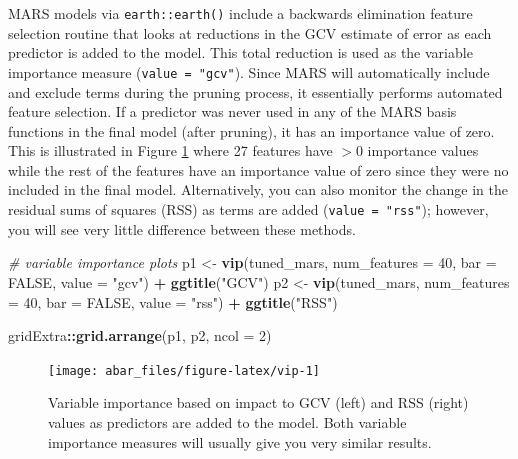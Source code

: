 \documentclass[]{book}
\newenvironment{Shaded}{\begin{snugshade}}{\end{snugshade}}
\newcommand{\CommentTok}[1]{\textcolor[rgb]{0.56,0.35,0.01}{\textit{#1}}}
\newcommand{\DataTypeTok}[1]{\textcolor[rgb]{0.13,0.29,0.53}{#1}}
\newcommand{\DecValTok}[1]{\textcolor[rgb]{0.00,0.00,0.81}{#1}}
\newcommand{\KeywordTok}[1]{\textcolor[rgb]{0.13,0.29,0.53}{\textbf{#1}}}
\newcommand{\NormalTok}[1]{#1}
\newcommand{\OperatorTok}[1]{\textcolor[rgb]{0.81,0.36,0.00}{\textbf{#1}}}
\newcommand{\OtherTok}[1]{\textcolor[rgb]{0.56,0.35,0.01}{#1}}
\newcommand{\StringTok}[1]{\textcolor[rgb]{0.31,0.60,0.02}{#1}}
\theoremstyle{definition}
\theoremstyle{definition}
\theoremstyle{definition}
\theoremstyle{remark}
\begin{document}
MARS models via \texttt{earth::earth()} include a backwards elimination
feature selection routine that looks at reductions in the GCV estimate
of error as each predictor is added to the model. This total reduction
is used as the variable importance measure (\texttt{value\ =\ "gcv"}).
Since MARS will automatically include and exclude terms during the
pruning process, it essentially performs automated feature selection. If
a predictor was never used in any of the MARS basis functions in the
final model (after pruning), it has an importance value of zero. This is
illustrated in Figure \ref{fig:vip} where 27 features have \(>0\)
importance values while the rest of the features have an importance
value of zero since they were no included in the final model.
Alternatively, you can also monitor the change in the residual sums of
squares (RSS) as terms are added (\texttt{value\ =\ "rss"}); however,
you will see very little difference between these methods.

\begin{Shaded}
\begin{Highlighting}[]
\CommentTok{# variable importance plots}
\NormalTok{p1 <-}\StringTok{ }\KeywordTok{vip}\NormalTok{(tuned_mars, }\DataTypeTok{num_features =} \DecValTok{40}\NormalTok{, }\DataTypeTok{bar =} \OtherTok{FALSE}\NormalTok{, }\DataTypeTok{value =} \StringTok{"gcv"}\NormalTok{) }\OperatorTok{+}\StringTok{ }\KeywordTok{ggtitle}\NormalTok{(}\StringTok{"GCV"}\NormalTok{)}
\NormalTok{p2 <-}\StringTok{ }\KeywordTok{vip}\NormalTok{(tuned_mars, }\DataTypeTok{num_features =} \DecValTok{40}\NormalTok{, }\DataTypeTok{bar =} \OtherTok{FALSE}\NormalTok{, }\DataTypeTok{value =} \StringTok{"rss"}\NormalTok{) }\OperatorTok{+}\StringTok{ }\KeywordTok{ggtitle}\NormalTok{(}\StringTok{"RSS"}\NormalTok{)}

\NormalTok{gridExtra}\OperatorTok{::}\KeywordTok{grid.arrange}\NormalTok{(p1, p2, }\DataTypeTok{ncol =} \DecValTok{2}\NormalTok{)}
\end{Highlighting}
\end{Shaded}

\begin{figure}

{\centering \texttt{[image: abar\_files/figure-latex/vip-1]} 

}

\caption{Variable importance based on impact to GCV (left) and RSS (right) values as predictors are added to the model. Both variable importance measures will usually give you very similar results.}\label{fig:vip}
\end{figure}
\end{document}
